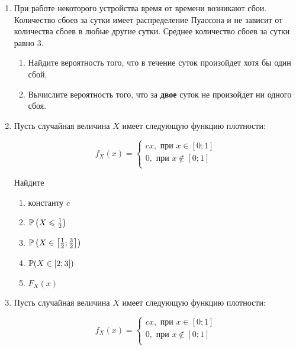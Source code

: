 \begin{enumerate}

\item При работе некоторого устройства время от времени возникают сбои.
Количество сбоев за сутки имеет распределение Пуассона и не зависит от количества сбоев в любые другие сутки. Среднее количество сбоев за сутки равно 3.

\begin{enumerate}
	\item Найдите вероятность того, что в течение суток произойдет хотя бы один сбой.
	\item Вычислите вероятность того, что за \textbf{двое} суток не произойдет ни одного сбоя.
\end{enumerate}

\item Пусть случайная величина $X$ имеет следующую функцию плотности:

\[
f_X(x) =
	\begin{cases}
	cx,\text{ при }  x \in [0; 1] \\
	0,\text{ при } x \notin  [0; 1] \\
	\end{cases}
\]

Найдите
\begin{enumerate}
	\item константу $c$
	\item $\P\left(X \leq \frac{1}{2}\right)$
	\item $\P\left(X \in \left[\frac{1}{2}; \frac{3}{2}\right]\right)$
	\item $\P(X \in [2;3])$
	\item $F_X(x)$
\end{enumerate}


\item Пусть случайная величина $X$ имеет следующую функцию плотности:

\[
f_X(x) =
	\begin{cases}
	cx,\text{ при }  x \in [0; 1] \\
	0,\text{ при } x \notin  [0; 1] \\
	\end{cases}
\]


\end{enumerate}
